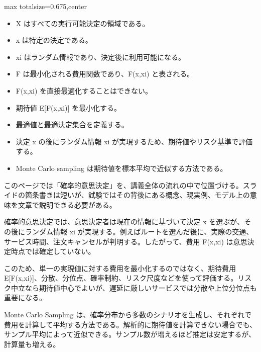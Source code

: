 \clearpage
{}
\begin{adjustbox}{max totalsize={\textwidth}{0.675\textheight},center}
\begin{minipage}{\textwidth}\scriptsize
\begin{minipage}[t]{0.485\textwidth}
\begin{itemize}
\item X はすべての実行可能決定の領域である。
\item x は特定の決定である。
\item xi はランダム情報であり、決定後に利用可能になる。
\item F は最小化される費用関数であり、F(x,xi) と表される。
\item F(x,xi) を直接最適化することはできない。
\item 期待値 E[F(x,xi)] を最小化する。
\item 最適値と最適決定集合を定義する。
\end{itemize}
\begin{itemize}
\item 決定 x の後にランダム情報 xi が実現するため、期待値やリスク基準で評価する。
\item Monte Carlo sampling は期待値を標本平均で近似する方法である。
\end{itemize}
\end{minipage}\hfill
\begin{minipage}[t]{0.485\textwidth}
このページでは「確率的意思決定」を、講義全体の流れの中で位置づける。スライドの箇条書きは短いが、試験ではその背後にある概念、現実例、モデル上の意味を文章で説明できる必要がある。\par
確率的意思決定では、意思決定者は現在の情報に基づいて決定 x を選ぶが、その後にランダム情報 xi が実現する。例えばルートを選んだ後に、実際の交通、サービス時間、注文キャンセルが判明する。したがって、費用 F(x,xi) は意思決定時点では確定していない。\par
このため、単一の実現値に対する費用を最小化するのではなく、期待費用 E[F(x,xi)]、分散、分位点、確率制約、リスク尺度などを使って評価する。リスク中立なら期待値中心でよいが、遅延に厳しいサービスでは分散や上位分位点も重要になる。\par
Monte Carlo Sampling は、確率分布から多数のシナリオを生成し、それぞれで費用を計算して平均する方法である。解析的に期待値を計算できない場合でも、サンプル平均によって近似できる。サンプル数が増えるほど推定は安定するが、計算量も増える。\par

\end{minipage}
\end{minipage}
\end{adjustbox}
